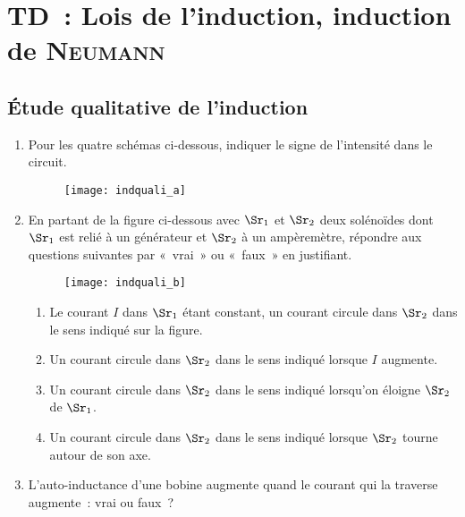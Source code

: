 \documentclass[a4paper, 10pt, final, garamond]{book}
\begin{document}
\setcounter{chapter}{2}

\chapter{TD~: Lois de l'induction, induction de \textsc{Neumann}}
\section{Étude qualitative de l'induction}
\label{sec:indquali}
\begin{enumerate}
	\item Pour les quatre schémas ci-dessous, indiquer le signe de l'intensité
	      dans le circuit.
	      \begin{figure}[h]
		      \centering
		      \texttt{[image: indquali\_a]}
		      \label{fig:indquali_a}
	      \end{figure}
	\item En partant de la figure ci-dessous avec $\Sr_1$ et $\Sr_2$ deux
	      solénoïdes dont $\Sr_1$ est relié à un générateur et $\Sr_2$ à un
	      ampèremètre, répondre aux questions suivantes par «~vrai~» ou «~faux~» en
	      justifiant.
	      \begin{figure}[h]
		      \centering
		      \texttt{[image: indquali\_b]}
		      \label{fig:indquali_b}
	      \end{figure}
	      \begin{enumerate}
		      \item Le courant $I$ dans $\Sr_1$ étant constant, un courant circule dans
		            $\Sr_2$ dans le sens indiqué sur la figure.
		      \item Un courant circule dans $\Sr_2$ dans le sens indiqué lorsque $I$
		            augmente.
		      \item Un courant circule dans $\Sr_2$ dans le sens indiqué lorsqu'on
		            éloigne $\Sr_2$ de $\Sr_1$.
		      \item Un courant circule dans $\Sr_2$ dans le sens indiqué lorsque $\Sr_2$
		            tourne autour de son axe.
	      \end{enumerate}
	\item L'auto-inductance d'une bobine augmente quand le courant qui la traverse
	      augmente~: vrai ou faux~?
\end{enumerate}
\end{document}
